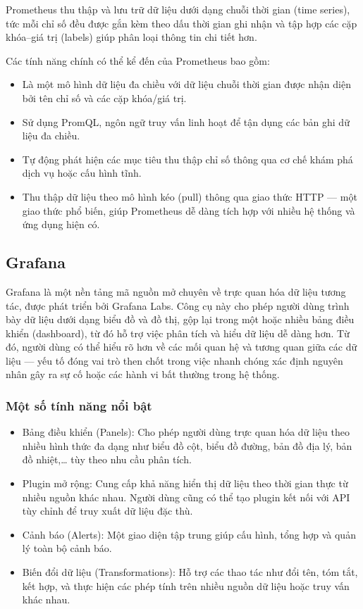 Prometheus thu thập và lưu trữ dữ liệu dưới dạng chuỗi thời gian (time series), tức mỗi chỉ số đều được gắn kèm theo dấu thời gian ghi nhận và tập hợp các cặp khóa–giá trị (labels) giúp phân loại thông tin chi tiết hơn.

Các tính năng chính có thể kể đến của Prometheus bao gồm:
\begin{itemize}
    \item Là một mô hình dữ liệu đa chiều với dữ liệu chuỗi thời gian được nhận diện bởi tên chỉ số và các cặp khóa/giá trị.
    \item Sử dụng PromQL, ngôn ngữ truy vấn linh hoạt để tận dụng các bản ghi dữ liệu đa chiều.
    \item Tự động phát hiện các mục tiêu thu thập chỉ số thông qua cơ chế khám phá dịch vụ hoặc cấu hình tĩnh.
    \item Thu thập dữ liệu theo mô hình kéo (pull) thông qua giao thức HTTP — một giao thức phổ biến, giúp Prometheus dễ dàng tích hợp với nhiều hệ thống và ứng dụng hiện có.
\end{itemize}

\subsection{Grafana}

Grafana \autocite{redhatgrafana} là một nền tảng mã nguồn mở chuyên về trực quan hóa dữ liệu tương tác, được phát triển bởi Grafana Labs. Công cụ này cho phép người dùng trình bày dữ liệu dưới dạng biểu đồ và đồ thị, gộp lại trong một hoặc nhiều bảng điều khiển (dashboard), từ đó hỗ trợ việc phân tích và hiểu dữ liệu dễ dàng hơn. Từ đó, người dùng có thể hiểu rõ hơn về các mối quan hệ và tương quan giữa các dữ liệu — yếu tố đóng vai trò then chốt trong việc nhanh chóng xác định nguyên nhân gây ra sự cố hoặc các hành vi bất thường trong hệ thống.

\subsubsection{Một số tính năng nổi bật}

\begin{itemize}
    \item Bảng điều khiển (Panels): Cho phép người dùng trực quan hóa dữ liệu theo nhiều hình thức đa dạng như biểu đồ cột, biểu đồ đường, bản đồ địa lý, bản đồ nhiệt,… tùy theo nhu cầu phân tích.
    \item Plugin mở rộng: Cung cấp khả năng hiển thị dữ liệu theo thời gian thực từ nhiều nguồn khác nhau. Người dùng cũng có thể tạo plugin kết nối với API tùy chỉnh để truy xuất dữ liệu đặc thù.
    \item Cảnh báo (Alerts): Một giao diện tập trung giúp cấu hình, tổng hợp và quản lý toàn bộ cảnh báo.
    \item Biến đổi dữ liệu (Transformations): Hỗ trợ các thao tác như đổi tên, tóm tắt, kết hợp, và thực hiện các phép tính trên nhiều nguồn dữ liệu hoặc truy vấn khác nhau.
\end{itemize}

